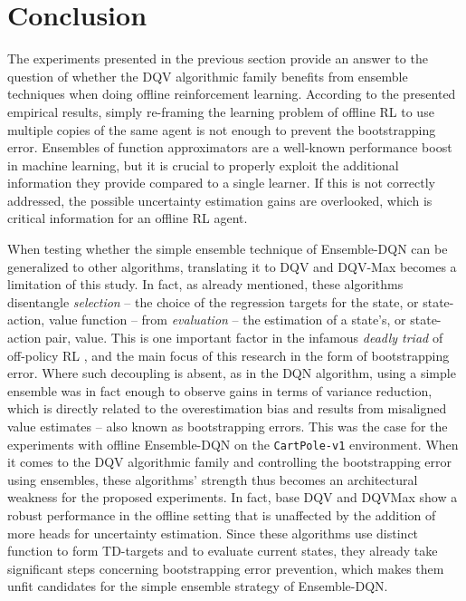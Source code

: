 \section{Conclusion}\label{sec:Conclusion}
The experiments presented in the previous section provide an answer to the
question of whether the DQV algorithmic family benefits from ensemble
techniques when doing offline reinforcement learning. According to the
presented empirical results, simply re-framing the learning problem of
offline RL to use multiple copies of the same agent is not enough to
prevent the bootstrapping error. Ensembles of function approximators
are a well-known performance boost in machine learning, but it is
crucial to properly exploit the additional information they provide
compared to a single learner. If this is not correctly addressed, the
possible uncertainty estimation gains are overlooked, which is
critical information for an offline RL agent.

When testing whether the simple ensemble technique of Ensemble-DQN can
be generalized to other algorithms, translating it to DQV and DQV-Max
becomes a limitation of this study. In fact, as already mentioned,
these algorithms disentangle \textit{selection} -- the choice of the
regression targets for the state, or state-action, value function --
from \textit{evaluation} -- the estimation of a state's, or
state-action pair, value. This is one important factor in the infamous
\textit{deadly triad} of off-policy RL
\citep{sutton2018reinforcement}, and the main focus of this research
in the form of bootstrapping error. Where such decoupling is absent,
as in the DQN algorithm, using a simple ensemble was in fact enough to
observe gains in terms of variance reduction, which is directly
related to the overestimation bias \citep{anschel2017averaged} and
results from misaligned value estimates -- also known as bootstrapping
errors. This was the case for the experiments with offline
Ensemble-DQN on the \texttt{CartPole-v1} environment. When it comes to
the DQV algorithmic family and controlling the bootstrapping error
using ensembles, these algorithms' strength thus becomes an
architectural weakness for the proposed experiments. In fact, base DQV
and DQVMax show a robust performance in the offline setting that is
unaffected by the addition of more heads for uncertainty
estimation. Since these algorithms use distinct function to form
TD-targets and to evaluate current states, they already take
significant steps concerning bootstrapping error prevention, which
makes them unfit candidates for the simple ensemble strategy of
Ensemble-DQN.\

